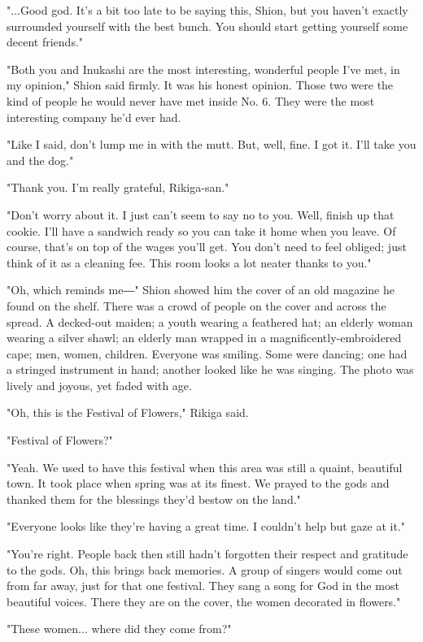 "...Good god. It's a bit too late to be saying this, Shion, but you haven't exactly surrounded yourself with the best bunch. You should start getting yourself some decent friends."

"Both you and Inukashi are the most interesting, wonderful people I've met, in my opinion," Shion said firmly. It was his honest opinion. Those two were the kind of people he would never have met inside No. 6. They were the most interesting company he'd ever had.

"Like I said, don't lump me in with the mutt. But, well, fine. I got it. I'll take you and the dog."

"Thank you. I'm really grateful, Rikiga-san."

"Don't worry about it. I just can't seem to say no to you. Well, finish up that cookie. I'll have a sandwich ready so you can take it home when you leave. Of course, that's on top of the wages you'll get. You don't need to feel obliged; just think of it as a cleaning fee. This room looks a lot neater thanks to you."

"Oh, which reminds me―" Shion showed him the cover of an old magazine he found on the shelf. There was a crowd of people on the cover and across the spread. A decked-out maiden; a youth wearing a feathered hat; an elderly woman wearing a silver shawl; an elderly man wrapped in a magnificently-embroidered cape; men, women, children. Everyone was smiling. Some were dancing; one had a stringed instrument in hand; another looked like he was singing. The photo was lively and joyous, yet faded with age.

"Oh, this is the Festival of Flowers," Rikiga said.

"Festival of Flowers?"

"Yeah. We used to have this festival when this area was still a quaint, beautiful town. It took place when spring was at its finest. We prayed to the gods and thanked them for the blessings they'd bestow on the land."

"Everyone looks like they're having a great time. I couldn't help but gaze at it."

"You're right. People back then still hadn't forgotten their respect and gratitude to the gods. Oh, this brings back memories. A group of singers would come out from far away, just for that one festival. They sang a song for God in the most beautiful voices. There they are on the cover, the women decorated in flowers."

"These women... where did they come from?"

